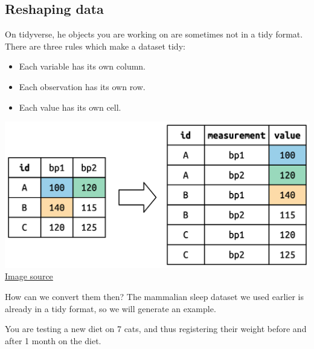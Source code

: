 \documentclass[
]{book}
\providecommand{\tightlist}{%
  \setlength{\itemsep}{0pt}\setlength{\parskip}{0pt}}
\begin{document}
\hypertarget{reshaping-data}{%
\subsection*{Reshaping data}\label{reshaping-data}}

On tidyverse, he objects you are working on are sometimes not in a tidy format.
There are three rules which make a dataset tidy:

\begin{itemize}
\tightlist
\item
  Each variable has its own column.
\item
  Each observation has its own row.
\item
  Each value has its own cell.
\end{itemize}

\includegraphics{figures/tidyexp.png} \href{https://r4ds.hadley.nz/data-tidy.html}{Image source}

How can we convert them then?
The mammalian sleep dataset we used earlier is already in a tidy format, so we will generate an example.

You are testing a new diet on 7 cats, and thus registering their weight before and after 1 month on the diet.
\end{document}
